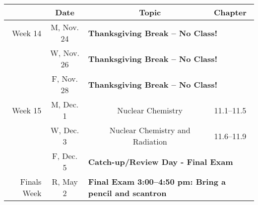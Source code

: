 \documentclass[12pt, letterpaper]{article}
\begin{document}
\begin{tabular}{rcccc}
& Date && Topic & Chapter\\
\midrule
Week 14 & M, Nov. 24& \multicolumn{3}{l}{\textbf{Thanksgiving Break -- No Class!}}\\
& W, Nov. 26& \multicolumn{3}{l}{\textbf{Thanksgiving Break -- No Class!}}\\
& F, Nov. 28& \multicolumn{3}{l}{\textbf{Thanksgiving Break -- No Class!}}\\
\midrule
Week 15 & M, Dec. 1&& Nuclear Chemistry & 11.1--11.5\\
& W, Dec. 3&& Nuclear Chemistry and Radiation & 11.6--11.9\\
& F, Dec. 5& \multicolumn{3}{l}{\textbf{Catch-up/Review Day - Final Exam}}\\
\midrule
Finals Week& R, May 2& \multicolumn{3}{l}{\textbf{Final Exam 3:00--4:50 pm: Bring a pencil and scantron}}\\
\end{tabular}
\end{document}
